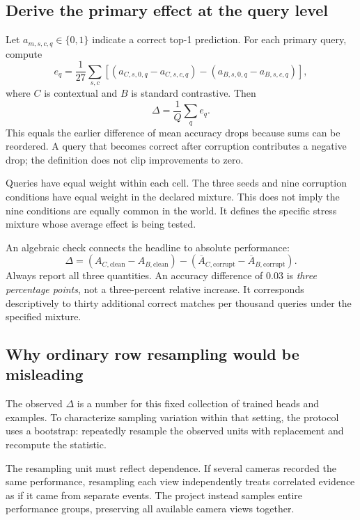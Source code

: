 \subsection{Derive the primary effect at the query level}
Let $a_{m,s,c,q}\in\{0,1\}$ indicate a correct top-1 prediction. For each
primary query, compute
\[
 e_q=\frac1{27}\sum_{s,c}
 \left[(a_{C,s,0,q}-a_{C,s,c,q})
       -(a_{B,s,0,q}-a_{B,s,c,q})\right],
\]
where $C$ is contextual and $B$ is standard contrastive. Then
\[
 \Delta=\frac1Q\sum_q e_q.
\]
This equals the earlier difference of mean accuracy drops because sums can be
reordered. A query that becomes correct after corruption contributes a negative
drop; the definition does not clip improvements to zero.

Queries have equal weight within each cell. The three seeds and nine corruption
conditions have equal weight in the declared mixture. This does not imply the
nine conditions are equally common in the world. It defines the specific stress
mixture whose average effect is being tested.

An algebraic check connects the headline to absolute performance:
\[
 \Delta=(A_{C,\mathrm{clean}}-A_{B,\mathrm{clean}})
        -(\overline A_{C,\mathrm{corrupt}}-\overline A_{B,\mathrm{corrupt}}).
\]
Always report all three quantities. An accuracy difference of $0.03$ is
\emph{three percentage points}, not a three-percent relative increase. It
corresponds descriptively to thirty additional correct matches per thousand
queries under the specified mixture.

\subsection{Why ordinary row resampling would be misleading}
The observed $\Delta$ is a number for this fixed collection of trained heads
and examples. To characterize sampling variation within that setting, the
protocol uses a bootstrap: repeatedly resample the observed units with
replacement and recompute the statistic.

The resampling unit must reflect dependence. If several cameras recorded the
same performance, resampling each view independently treats correlated evidence
as if it came from separate events. The project instead samples entire
performance groups, preserving all available camera views together.

